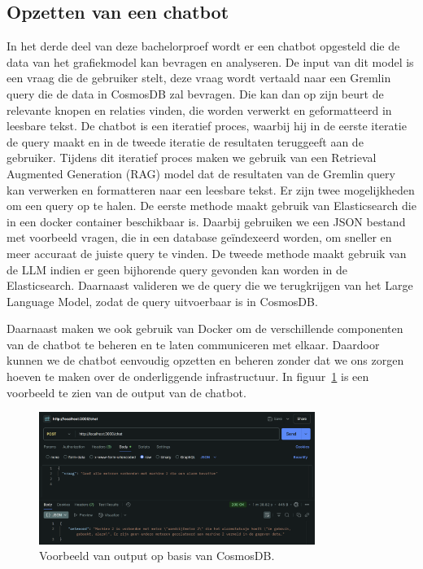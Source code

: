 \subsection{Opzetten van een chatbot}
In het derde deel van deze bachelorproef wordt er een chatbot opgesteld die de data van het grafiekmodel kan bevragen en analyseren.
De input van dit model is een vraag die de gebruiker stelt, deze vraag wordt vertaald naar een Gremlin query die de data in CosmosDB zal bevragen.
Die kan dan op zijn beurt de relevante knopen en relaties vinden, die worden verwerkt en geformatteerd in leesbare tekst.
De chatbot is een iteratief proces, waarbij hij in de eerste iteratie de query maakt en in de tweede iteratie de resultaten teruggeeft aan de gebruiker.
Tijdens dit iteratief proces maken we gebruik van een Retrieval Augmented Generation (RAG) model dat de resultaten van de Gremlin query kan verwerken en formatteren naar een leesbare tekst.
Er zijn twee mogelijkheden om een query op te halen. De eerste methode maakt gebruik van Elasticsearch die in een docker container beschikbaar is. 
Daarbij gebruiken we een JSON bestand met voorbeeld vragen, die in een database geïndexeerd worden, om sneller en meer accuraat de juiste query te vinden.
De tweede methode maakt gebruik van de LLM indien er geen bijhorende query gevonden kan worden in de Elasticsearch.
Daarnaast valideren we de query die we terugkrijgen van het Large Language Model, zodat de query uitvoerbaar is in CosmosDB.\@

Daarnaast maken we ook gebruik van Docker om de verschillende componenten van de chatbot te beheren en te laten communiceren met elkaar.
Daardoor kunnen we de chatbot eenvoudig opzetten en beheren zonder dat we ons zorgen hoeven te maken over de onderliggende infrastructuur.
In figuur~\ref{fig:output} is een voorbeeld te zien van de output van de chatbot.
\begin{figure}[H]
    \centering
    \includegraphics[width=0.8\textwidth]{./img/response.png}
    \caption[Output chatbot]{\label{fig:output}Voorbeeld van output op basis van CosmosDB.}
\end{figure}

